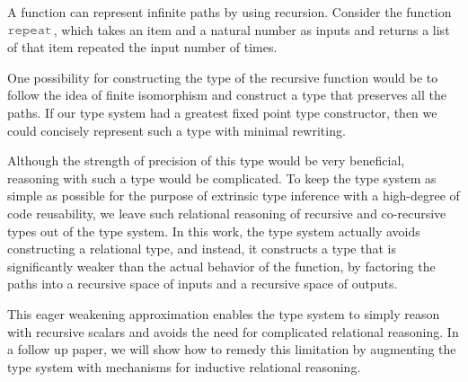 \documentclass[acmsmall]{acmart}
\theoremstyle{definition}
\begin{document}

A function can represent infinite paths by using recursion.
Consider the function $\J{repeat}$, which takes an item and a natural number
as inputs and returns a list of that item repeated the input number of times.

\block{
  \J{def repeat = [x => loop([self => [}
  \\
  \I \J{[zero;@ => nil;@]}
  \\
  \I \J{[succ;n => <cons>(x,self(n))]}
  \\
  \J{])]}
}

\noindent
One possibility for constructing the type of the recursive function would
be to follow the idea of finite isomorphism and construct a type 
that preserves all the paths. If our type system had a greatest fixed point
type constructor, then we could concisely represent such a type with minimal
rewriting.


\noindent
Although the strength of precision of this type would be very beneficial,
reasoning with such a type would be complicated. To keep the type system as
simple as possible for the purpose of extrinsic type inference with a high-degree
of code reusability, we leave such relational reasoning of recursive and co-recursive types out of
the type system. 
In this work, the type system actually avoids constructing a relational type, and instead, it
constructs a type that is significantly weaker than the actual behavior of the function,
by factoring the paths into a recursive space of inputs and a recursive space of outputs. 


\noindent
This eager weakening approximation enables the type system
to simply reason with recursive scalars and avoids the need for complicated
relational reasoning. In a follow up paper,
we will show how to remedy this limitation by augmenting the type system with
mechanisms for inductive relational reasoning.
\end{document}
